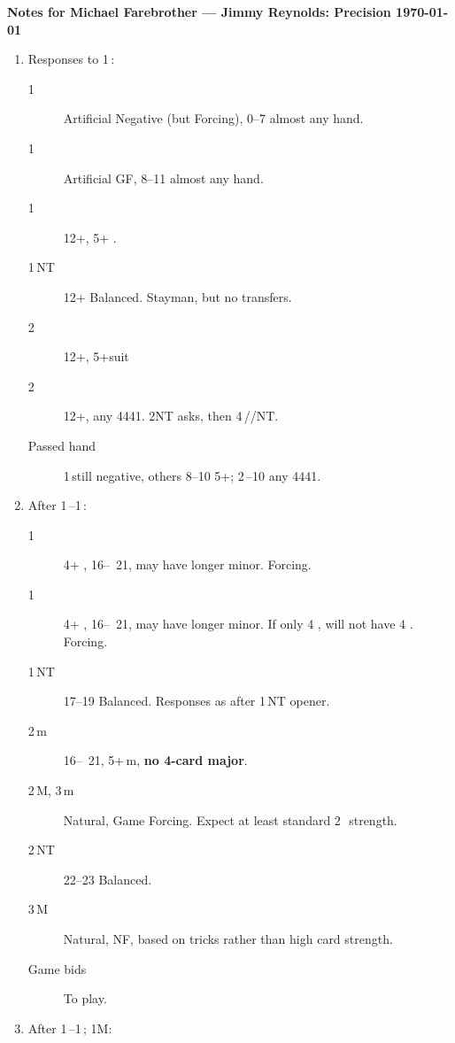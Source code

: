 \documentclass[12pt]{article}
\begin{document}
\newcommand{\additionaltikz}{%
%
} %
\drawconventioncard

\newpage
\centerline{\large\textbf{Notes for Michael Farebrother --- Jimmy Reynolds: Precision \today{}}}
\begin{footnotesize}
    \begin{enumerate}
        \item \label{itm:1c_resp}Responses to 1\,\bc:
        \begin{description}
            \item [1\,\rd] Artificial Negative (but Forcing), 0--7 almost any hand.
            \item [1\,\rh] Artificial GF, 8--11 almost any hand.
            \item [1\,\bs] 12+, 5+ \bs.
            \item [1\,NT] 12+ Balanced.
                Stayman, but no transfers.
            \item [2\,\,\rh] 12+, 5+suit
            \item [2\,\bs] 12+, any 4441.
                2NT asks, then 4\,\bc/\rd/NT\@.
            \item[Passed hand] 1\,\rd still negative, others 8--10 5+; 2\,--10 any 4441.
        \end{description}
        \item \label{itm:1c1d_rebid} After 1\,\bc--1\,\rd:
        \begin{description}
            \item [1\,\rh] 4+ \rh, 16--~21, may have longer minor.
            Forcing.
            \item [1\,\bs] 4+ \bs, 16--~21, may have longer minor.
            If only 4 \bs, will not have 4 \rh.
            Forcing.
            \item [1\,NT] 17--19 Balanced.
            Responses as after 1\,NT opener.
            \item [2\,m] 16--~21, 5+\,m, \textbf{no 4-card major}.
            \item [2\,M, 3\,m] Natural, Game Forcing.
            Expect at least standard 2\,\bc\ strength.
            \item [2\,NT] 22--23 Balanced.
            \item [3\,M] Natural, NF, based on tricks rather than high card strength.
            \item [Game bids] To play.
        \end{description}
        \item \label{itm:1c1d1M_resp} After 1\,\bc--1\,\rd; 1M:

\end{enumerate}
\end{footnotesize}
\end{document}

